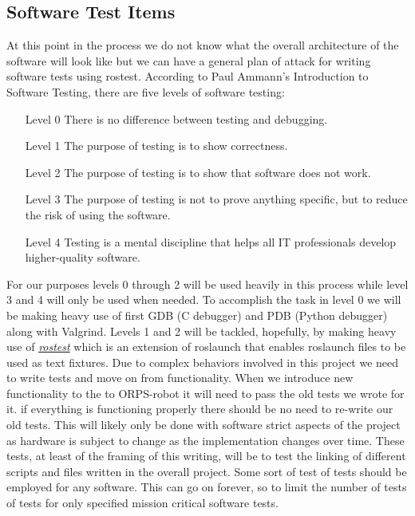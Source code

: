 \documentclass[english,12pt]{article}
\begin{document}
\subsection{Software Test Items}
At this point in the process we do not know what the overall architecture of the software will 
look like but we can have a general plan of attack for writing software tests using rostest. According 
to Paul Ammann's Introduction to Software Testing, there are five levels of software testing: \\
\begin{itemize}
    \item[Level 0] There is no difference between testing and debugging.
    \item[Level 1] The purpose of testing is to show correctness.
    \item[Level 2] The purpose of testing is to show that software does not work.
    \item[Level 3] The purpose of testing is not to prove anything specific, 
    but to reduce the risk of using the software.
    \item[Level 4] Testing is a mental discipline that helps all IT professionals 
    develop higher-quality software.
\end{itemize}
For our purposes levels 0 through 2 will be used heavily in this process while level 3 and 4 will 
only be used when needed. To accomplish the task in level 0 we will be making heavy use of first 
GDB (C debugger) and PDB (Python debugger) along with Valgrind. Levels 1 and 2 will be tackled, 
hopefully, by making heavy use of \href{http://wiki.ros.org/rostest}{\textit{rostest}} which is an 
extension of roslaunch that enables roslaunch files to be used as text fixtures. Due to complex 
behaviors involved in this project we need to write tests and move on from functionality. When we 
introduce new functionality to the to ORPS-robot it will need to pass the old tests we wrote for it. 
if everything is functioning properly there should be no need to re-write our old tests. This will 
likely only be done with software strict aspects of the project as hardware is subject to change as 
the implementation changes over time. These tests, at least of the framing of this writing, will be 
to test the linking of different scripts and files written in the overall project. Some sort of test 
of tests should be employed for any software. This can go on forever, so to limit the number of tests 
of tests for only specified mission critical software tests. \\\\\\
\end{document}
